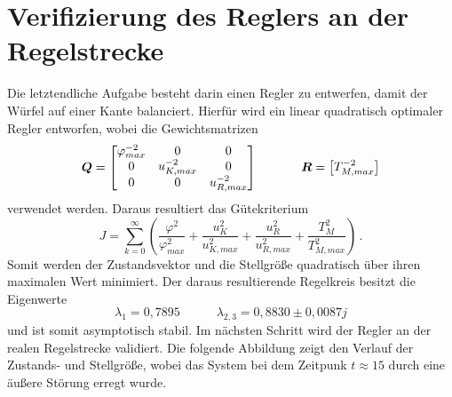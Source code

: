 \section{Verifizierung des Reglers an der Regelstrecke}
Die letztendliche Aufgabe besteht darin einen Regler zu entwerfen, damit der Würfel auf einer Kante balanciert. Hierfür wird ein linear quadratisch optimaler Regler entworfen, wobei die Gewichtsmatrizen
\begin{equation}
\boldsymbol{Q} = \begin{bmatrix}
\varphi^{-2}_{max} & 0 & 0 \\
0 & u^{-2}_{K,max} & 0 \\
0 & 0 & u^{-2}_{R,max}
\end{bmatrix}
\hspace{35pt}
\boldsymbol{R} = \begin{bmatrix} T^{-2}_{M,max} \end{bmatrix}
\end{equation}
verwendet werden. Daraus resultiert das Gütekriterium
\begin{equation}
J = \sum^{\infty}_{k=0}\left( \frac{\varphi^2}{\varphi^2_{max}} + \frac{u_K^2}{u^2_{K,max}} + \frac{u^2_{R}}{u^2_{R,max}} + \frac{T_M^2}{T^2_{M,max}}\right)\,.
\end{equation}
Somit werden der Zustandsvektor und die Stellgröße quadratisch über ihren maximalen Wert minimiert. Der daraus resultierende Regelkreis besitzt die Eigenwerte
\begin{equation}
\lambda_1 = 0,7895 \hspace{35pt} \lambda_{2,3} = 0,8830 \pm 0,0087j
\end{equation}
und ist somit asymptotisch stabil. Im nächsten Schritt wird der Regler an der realen Regelstrecke validiert. Die folgende Abbildung zeigt den Verlauf der Zustands- und Stellgröße, wobei das System bei dem Zeitpunk $t\approx 15$ durch eine äußere Störung erregt wurde.

